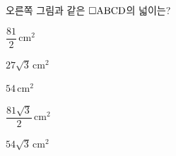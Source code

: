 \noindent\begin{minipage}[t]{0.58\linewidth}\vspace{0pt}\raggedright 오른쪽 그림과 같은 $\square\mathrm{ABCD}$의 넓이는?\end{minipage}\hfill\begin{minipage}[t]{0.4\linewidth}\vspace{0pt}\centering \resizebox{\ifdim\width>\linewidth\linewidth\else\width\fi}{!}{}\end{minipage}\par
\begin{choicesii}{\rule[-3ex]{0pt}{8ex}$\dfrac{81}{2}\,\mathrm{cm}^2$}{\rule[-3ex]{0pt}{8ex}$27\sqrt{3}\,\mathrm{cm}^2$}{\rule[-3ex]{0pt}{8ex}$54\,\mathrm{cm}^2$}{\rule[-3ex]{0pt}{8ex}$\dfrac{81\sqrt{3}}{2}\,\mathrm{cm}^2$}{\rule[-3ex]{0pt}{8ex}$54\sqrt{3}\,\mathrm{cm}^2$}\end{choicesii}
